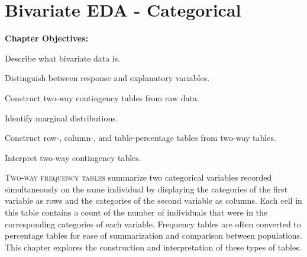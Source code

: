 \documentclass[10pt,openany]{book}\usepackage[]{graphicx}\usepackage[]{color}
\begin{document}
\chapter{Bivariate EDA - Categorical} \label{chap:BivEDACat}
\begin{ChapObj}{\boxwidth}
  \textbf{Chapter Objectives:}
  \begin{Enumerate}
    \item Describe what bivariate data is.
    \item Distinguish between response and explanatory variables.
    \item Construct two-way contingency tables from raw data.
    \item Identify marginal distributions.
    \item Construct row-, column-, and table-percentage tables from two-way tables.
    \item Interpret two-way contingency tables.
  \end{Enumerate}
\end{ChapObj}

\minitoc
\newpage

\lettrine{T}{wo-way frequency tables} summarize two categorical variables recorded simultaneously on the same individual by displaying the categories of the first variable as rows and the categories of the second variable as columns.  Each cell in this table contains a count of the number of individuals that were in the corresponding categories of each variable.  Frequency tables are often converted to percentage tables for ease of summarization and comparison between populations.  This chapter explores the construction and interpretation of these types of tables.
\end{document}
